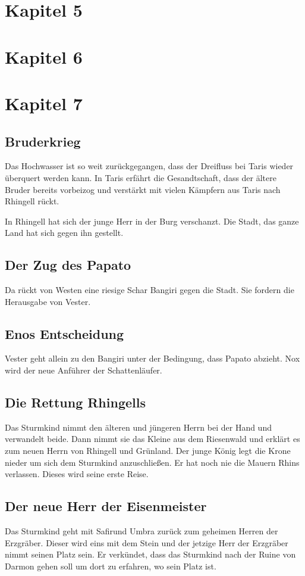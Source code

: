 \documentclass[12pt,a4paper,onecolumn,twoside,ngerman]{book}
\newcommand{\Eno}{Eno}
\newcommand{\Rhin}{Rhin}
\newcommand{\Safir}{Safir}
\begin{document}
\chapter{Kapitel 5}

\chapter{Kapitel 6}

\chapter{Kapitel 7}
\section{Bruderkrieg}
Das Hochwasser ist so weit zurückgegangen, dass der Dreifluss bei Taris wieder überquert werden kann. In Taris erfährt die Gesandtschaft, dass der ältere Bruder bereits vorbeizog und verstärkt mit vielen Kämpfern aus Taris nach Rhingell rückt. 

In Rhingell hat sich der junge Herr in der Burg verschanzt. Die Stadt, das ganze Land hat sich gegen ihn gestellt. 

\section{Der Zug des Papato}
Da rückt von Westen eine riesige Schar Bangiri gegen die Stadt. Sie fordern die Herausgabe von Vester.

\section{{\Eno}s Entscheidung}
Vester geht allein zu den Bangiri unter der Bedingung, dass Papato abzieht. Nox wird der neue Anführer der Schattenläufer.

\section{Die Rettung Rhingells}
Das Sturmkind nimmt den älteren und jüngeren Herrn bei der Hand und verwandelt beide. Dann nimmt sie das Kleine aus dem Riesenwald und erklärt es zum neuen Herrn von Rhingell und Grünland. Der junge König legt die Krone nieder um sich dem Sturmkind anzuschließen. Er hat noch nie die Mauern \Rhin{s} verlassen. Dieses wird seine erste Reise.

\section{Der neue Herr der Eisenmeister}
Das Sturmkind geht mit \Safir und Umbra zurück zum geheimen Herren der Erzgräber. Dieser wird eins mit dem Stein und der jetzige Herr der Erzgräber nimmt seinen Platz sein. Er verkündet, dass das Sturmkind nach der Ruine von Darmon gehen soll um dort zu erfahren, wo sein Platz ist.
\end{document}
